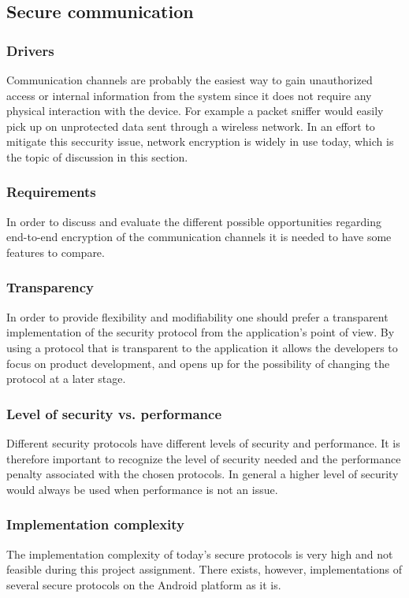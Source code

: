 \subsection{Secure communication}

\subsubsection{Drivers}
Communication channels are probably the easiest way to gain unauthorized access or internal information from the system since it does not require any physical interaction with the device. For example a packet sniffer would easily pick up on unprotected data sent through a wireless network. In an effort to mitigate this seccurity issue, network encryption is widely in use today, which is the topic of discussion in this section.

\subsubsection{Requirements}
In order to discuss and evaluate the different possible opportunities regarding end-to-end encryption of the communication channels it is needed to have some features to compare.

\subsubsection{Transparency}
In order to provide flexibility and modifiability one should prefer a transparent implementation of the security protocol from the application’s point of view. By using a protocol that is transparent to the application it allows the developers to focus on product development, and opens up for the possibility of changing the protocol at a later stage.

\subsubsection{Level of security vs. performance}
Different security protocols have different levels of security and performance. It is therefore important to recognize the level of security needed and the performance penalty associated with the chosen protocols. In general a higher level of security would always be used when performance is not an issue.

\subsubsection{Implementation complexity}
The implementation complexity of today's secure protocols is very high and not feasible during this project assignment. There exists, however, implementations of several secure protocols on the Android platform as it is. 

